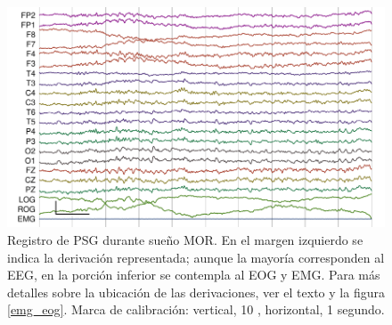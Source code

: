 \begin{figure}
\centering
\includegraphics[width=\linewidth]
{./img_ejemplos/MJNN_epoca_stam.pdf}
\caption[Registro de polisomnograma durante sueño MOR]
{Registro de PSG durante sueño MOR. En el margen izquierdo se indica la derivación representada; aunque la mayoría corresponden al EEG, en la porción inferior se contempla al EOG y EMG.
Para más detalles sobre la ubicación de las derivaciones, ver el texto y la figura \ref{emg_eog}. Marca de calibración: vertical, 10 \mv, horizontal, 1 segundo.}
\label{ejemplos_mor}
\end{figure}



